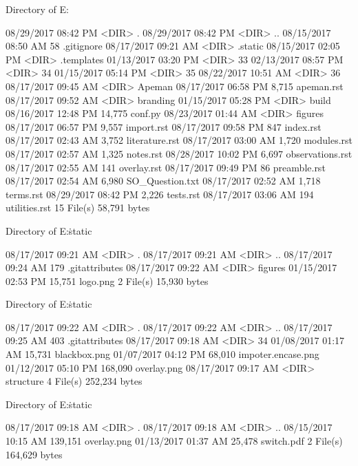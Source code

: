  Directory of E:\Python\apeman\docs

08/29/2017  08:42 PM    <DIR>          .
08/29/2017  08:42 PM    <DIR>          ..
08/15/2017  08:50 AM                58 .gitignore
08/17/2017  09:21 AM    <DIR>          .static
08/15/2017  02:05 PM    <DIR>          .templates
01/13/2017  03:20 PM    <DIR>          33
02/13/2017  08:57 PM    <DIR>          34
01/15/2017  05:14 PM    <DIR>          35
08/22/2017  10:51 AM    <DIR>          36
08/17/2017  09:45 AM    <DIR>          Apeman
08/17/2017  06:58 PM             8,715 apeman.rst
08/17/2017  09:52 AM    <DIR>          branding
01/15/2017  05:28 PM    <DIR>          build
08/16/2017  12:48 PM            14,775 conf.py
08/23/2017  01:44 AM    <DIR>          figures
08/17/2017  06:57 PM             9,557 import.rst
08/17/2017  09:58 PM               847 index.rst
08/17/2017  02:43 AM             3,752 literature.rst
08/17/2017  03:00 AM             1,720 modules.rst
08/17/2017  02:57 AM             1,325 notes.rst
08/28/2017  10:02 PM             6,697 observations.rst
08/17/2017  02:55 AM               141 overlay.rst
08/17/2017  09:49 PM                86 preamble.rst
08/17/2017  02:54 AM             6,980 SO_Question.txt
08/17/2017  02:52 AM             1,718 terms.rst
08/29/2017  08:42 PM             2,226 tests.rst
08/17/2017  03:06 AM               194 utilities.rst
              15 File(s)         58,791 bytes

 Directory of E:\Python\apeman\docs\.static

08/17/2017  09:21 AM    <DIR>          .
08/17/2017  09:21 AM    <DIR>          ..
08/17/2017  09:24 AM               179 .gitattributes
08/17/2017  09:22 AM    <DIR>          figures
01/15/2017  02:53 PM            15,751 logo.png
               2 File(s)         15,930 bytes

 Directory of E:\Python\apeman\docs\.static\figures

08/17/2017  09:22 AM    <DIR>          .
08/17/2017  09:22 AM    <DIR>          ..
08/17/2017  09:25 AM               403 .gitattributes
08/17/2017  09:18 AM    <DIR>          34
01/08/2017  01:17 AM            15,731 blackbox.png
01/07/2017  04:12 PM            68,010 impoter.encase.png
01/12/2017  05:10 PM           168,090 overlay.png
08/17/2017  09:17 AM    <DIR>          structure
               4 File(s)        252,234 bytes

 Directory of E:\Python\apeman\docs\.static\figures{}

08/17/2017  09:18 AM    <DIR>          .
08/17/2017  09:18 AM    <DIR>          ..
08/15/2017  10:15 AM           139,151 overlay.png
01/13/2017  01:37 AM            25,478 switch.pdf
               2 File(s)        164,629 bytes

